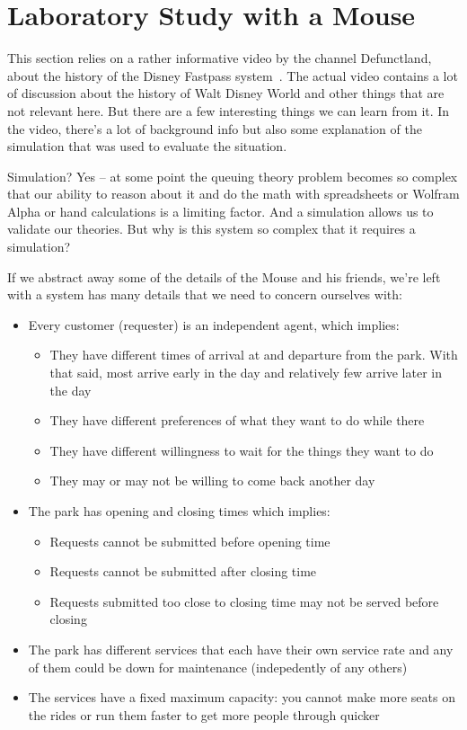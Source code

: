 \section*{Laboratory Study with a Mouse}

This section relies on a rather informative video by the channel Defunctland, about the history of the Disney Fastpass system~\cite{dldisney}. The actual video contains a lot of discussion about the history of Walt Disney World and other things that are not relevant here. But there are a few interesting things we can learn from it. In the video, there's a lot of background info but also some explanation of the simulation that was used to evaluate the situation.

Simulation? Yes -- at some point the queuing theory problem becomes so complex that our ability to reason about it and do the math with spreadsheets or Wolfram Alpha or hand calculations is a limiting factor. And a simulation allows us to validate our theories. But why is this system so complex that it requires a simulation?

If we abstract away some of the details of the Mouse and his friends, we're left with a system has many details that we need to concern ourselves with:

\begin{itemize}
	\item Every customer (requester) is an independent agent, which implies:
		\begin{itemize}
			\item They have different times of arrival at and departure from the park. With that said, most arrive early in the day and relatively few arrive later in the day
			\item They have different preferences of what they want to do while there
			\item They have different willingness to wait for the things they want to do
			\item They may or may not be willing to come back another day
		\end{itemize}
	\item The park has opening and closing times which implies:
		\begin{itemize}
		\item Requests cannot be submitted before opening time
		\item Requests cannot be submitted after closing time
		\item Requests submitted too close to closing time may not be served before closing
		\end{itemize}
	\item The park has different services that each have their own service rate and any of them could be down for maintenance (indepedently of any others)
	\item The services have a fixed maximum capacity: you cannot make more seats on the rides or run them faster to get more people through quicker
\end{itemize}


